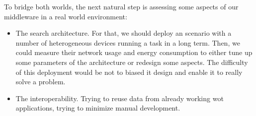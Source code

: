 To bridge both worlds, the next natural step is assessing some aspects of our middleware in a real world environment: %
\begin{itemize}
  \item The search architecture.
        For that, we should deploy an scenario with a number of heterogeneous devices running a task in a long term.
        Then, we could measure their network usage and energy consumption to either tune up some parameters of the architecture or redesign some aspects.
        The difficulty of this deployment would be not to biased it design and enable it to really solve a problem.
  \item The interoperability.
        Trying to reuse data from already working \ac{wot} applications, trying to minimize manual development.
\end{itemize}


